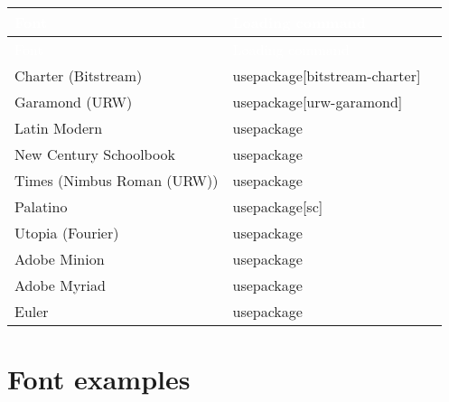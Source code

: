 { %
  \small\renewcommand{\arraystretch}{1.4}\sffamily
  \begin{longtabu} to 
  \hline
  \upshape
  \sffamily\textcolor{white}{Font} &
  \sffamily\textcolor{white}{Loading command}\\ \hline
\endfirsthead
  \hline
\upshape
  \sffamily\textcolor{white}{Font} &
  \sffamily\textcolor{white}{Loading command}\\ \hline
\endhead
  \hline 
\endfoot
  \hline
\endlastfoot
%
%
Charter (Bitstream) & \bs{}usepackage[bitstream-charter] \\
Garamond (URW)		& \bs{}usepackage[urw-garamond] \\
Latin Modern    	& \bs{}usepackage \\
New Century Schoolbook & \bs{}usepackage \\
Times (Nimbus Roman (URW))& \bs{}usepackage \\
Palatino			& \bs{}usepackage[sc] \\
Utopia (Fourier) 	& \bs{}usepackage \\
Adobe Minion		& \bs{}usepackage \\
Adobe Myriad		& \bs{}usepackage \\
Euler				& \bs{}usepackage \\
\end{longtabu}
} %

\section{Font examples}
\label{sec:doc:fonts:examples}

